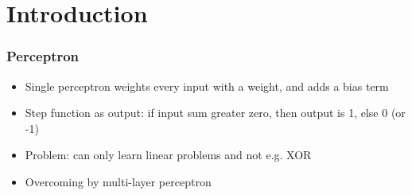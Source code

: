 \section{Introduction}
\subsubsection{Perceptron}
\begin{itemize}
	\item Single perceptron weights every input with a weight, and adds a bias term
	\item Step function as output: if input sum greater zero, then output is 1, else 0 (or -1)
	\item Problem: can only learn linear problems and not e.g. XOR
	\item Overcoming by multi-layer perceptron 
\end{itemize}